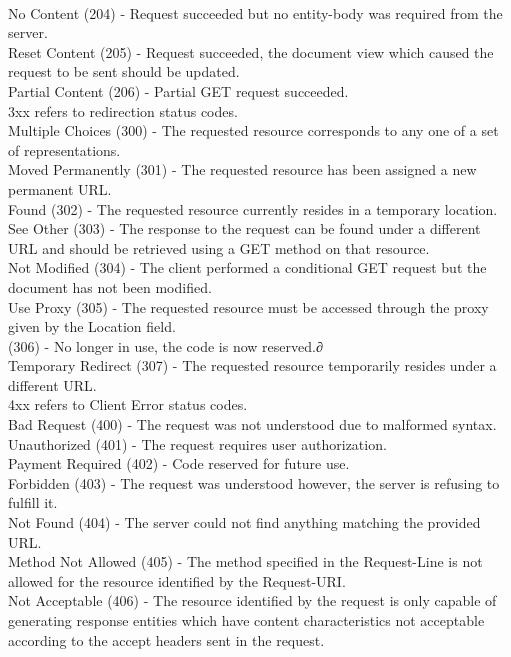 \documentclass[titlepage]{article}
\begin{document}
\\
No Content (204) - Request succeeded but no entity-body was required from the server.
\\
Reset Content (205) - Request succeeded, the document view which caused the request to be sent should be updated.
\\
Partial Content (206) - Partial GET request succeeded.
\\
3xx refers to redirection status codes.
\\
Multiple Choices (300) - The requested resource corresponds to any one of a set of representations.
\\
Moved Permanently (301) - The requested resource has been assigned a new permanent URL.
\\
Found (302) - The requested resource currently resides in a temporary location.
\\
See Other (303) - The response to the request can be found under a different URL and should be retrieved using a GET method on that resource.
\\
Not Modified (304) - The client performed a conditional GET request but the document has not been modified.
\\
Use Proxy (305) - The requested resource must be accessed through the proxy given by the Location field.
\\
(306) - No longer in use, the code is now reserved.∂
\\
Temporary Redirect (307) - The requested resource temporarily resides under a different URL.
\\
4xx refers to Client Error status codes.
\\
Bad Request (400) - The request was not understood due to malformed syntax.
\\
Unauthorized (401) - The request requires user authorization.
\\
Payment Required (402) - Code reserved for future use.
\\
Forbidden (403) - The request was understood however, the server is refusing to fulfill it.
\\
Not Found (404) - The server could not find anything matching the provided URL.
\\
Method Not Allowed (405) - The method specified in the Request-Line is not allowed for the resource identified by the Request-URI.
\\
Not Acceptable (406) - The resource identified by the request is only capable of generating response entities which have content characteristics not acceptable according to the accept headers sent in the request.
\end{document}
